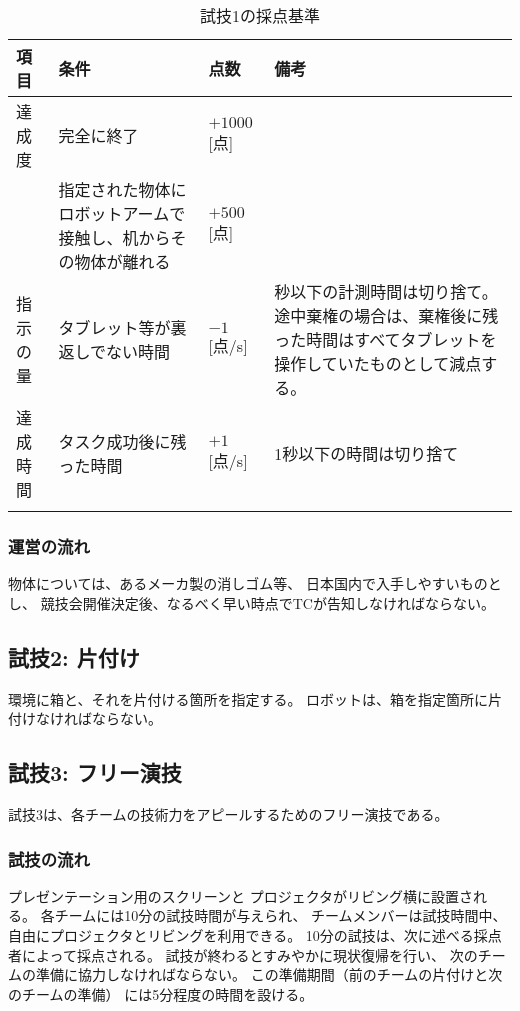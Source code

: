 \documentclass[a4j]{jarticle}
\def\thline{\noalign{\hrule height 1pt}}
\begin{document}
\begin{table}
\begin{center}
\caption{試技1の採点基準}
\label{table:test1score}
\begin{tabular}{l|p{5cm}|l|p{5cm}}
\thline
項目 & 条件 & 点数 & 備考\\
\hline
達成度 & 完全に終了 & $+1000$[点] \\
& 指定された物体にロボットアームで接触し、机からその物体が離れる & $+500$[点] \\
\hline
指示の量 & タブレット等が裏返しでない時間& $-1$[点/s] & 秒以下の計測時間は切り捨て。
途中棄権の場合は、棄権後に残った時間はすべてタブレットを操作していたものとして減点する。\\
\hline
達成時間 & タスク成功後に残った時間 & $+1$[点/s] & 1秒以下の時間は切り捨て\\
\thline
\end{tabular}
\end{center}
\end{table}



\subsubsection{運営の流れ}

物体については、あるメーカ製の消しゴム等、
日本国内で入手しやすいものとし、
競技会開催決定後、なるべく早い時点でTCが告知しなければならない。

\subsection{試技2: 片付け}

環境に箱と、それを片付ける箇所を指定する。
ロボットは、箱を指定箇所に片付けなければならない。



\subsection{試技3: フリー演技}

試技3は、各チームの技術力をアピールするためのフリー演技である。

\subsubsection{試技の流れ}

プレゼンテーション用のスクリーンと
プロジェクタがリビング横に設置される。
各チームには10分の試技時間が与えられ、
チームメンバーは試技時間中、
自由にプロジェクタとリビングを利用できる。
10分の試技は、次に述べる採点者によって採点される。
試技が終わるとすみやかに現状復帰を行い、
次のチームの準備に協力しなければならない。
この準備期間（前のチームの片付けと次のチームの準備）
には5分程度の時間を設ける。
\end{document}
